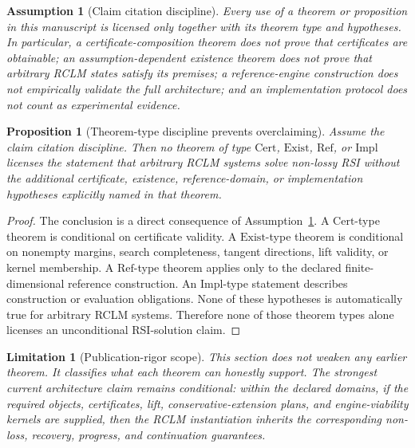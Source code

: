 \documentclass[11pt,a4paper]{article}
\newtheorem{proposition}[theorem]{Proposition}
\newtheorem{assumption}[theorem]{Assumption}
\newtheorem{limitation}[theorem]{Limitation}
\begin{document}
\begin{assumption}[Claim citation discipline]
\label{ass:rclm-claim-citation-discipline}
Every use of a theorem or proposition in this manuscript is licensed only together with its theorem type and hypotheses. In particular, a certificate-composition theorem does not prove that certificates are obtainable; an assumption-dependent existence theorem does not prove that arbitrary RCLM states satisfy its premises; a reference-engine construction does not empirically validate the full architecture; and an implementation protocol does not count as experimental evidence.
\end{assumption}

\begin{proposition}[Theorem-type discipline prevents overclaiming]
\label{prop:rclm-theorem-type-discipline}
Assume the claim citation discipline. Then no theorem of type \(\mathrm{Cert}\), \(\mathrm{Exist}\), \(\mathrm{Ref}\), or \(\mathrm{Impl}\) licenses the statement that arbitrary RCLM systems solve non-lossy RSI without the additional certificate, existence, reference-domain, or implementation hypotheses explicitly named in that theorem.
\end{proposition}

\begin{proof}
The conclusion is a direct consequence of Assumption~\ref{ass:rclm-claim-citation-discipline}. A \(\mathrm{Cert}\)-type theorem is conditional on certificate validity. A \(\mathrm{Exist}\)-type theorem is conditional on nonempty margins, search completeness, tangent directions, lift validity, or kernel membership. A \(\mathrm{Ref}\)-type theorem applies only to the declared finite-dimensional reference construction. An \(\mathrm{Impl}\)-type statement describes construction or evaluation obligations. None of these hypotheses is automatically true for arbitrary RCLM systems. Therefore none of those theorem types alone licenses an unconditional RSI-solution claim.
\end{proof}

\begin{limitation}[Publication-rigor scope]
This section does not weaken any earlier theorem. It classifies what each theorem can honestly support. The strongest current architecture claim remains conditional: within the declared domains, if the required objects, certificates, lift, conservative-extension plans, and engine-viability kernels are supplied, then the RCLM instantiation inherits the corresponding non-loss, recovery, progress, and continuation guarantees.
\end{limitation}
\end{document}
